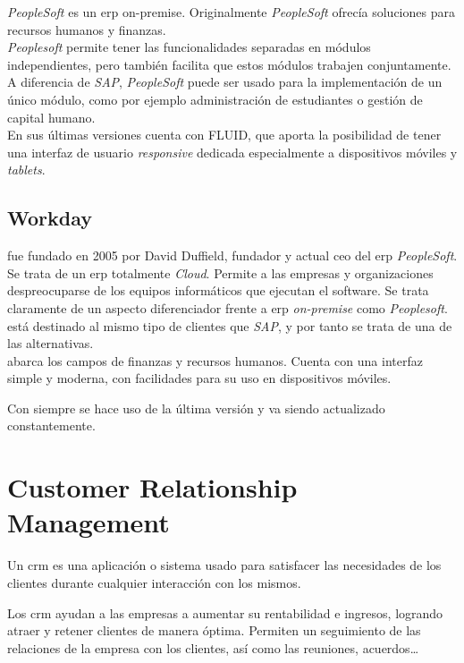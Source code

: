 \textit{PeopleSoft} es un \acrshort{erp} \gls{on-premise}.
Originalmente \textit{PeopleSoft} ofrecía soluciones para recursos humanos y finanzas.\\

\textit{Peoplesoft} permite tener las funcionalidades separadas en módulos independientes, pero también facilita que estos módulos trabajen conjuntamente.
A diferencia de \textit{SAP}, \textit{PeopleSoft} puede ser usado para la implementación de un único módulo, como por ejemplo administración de estudiantes o gestión de capital humano.\\

En sus últimas versiones cuenta con FLUID, que aporta la posibilidad de tener una interfaz de usuario \textit{responsive} dedicada especialmente a dispositivos móviles y \textit{tablets}.


\subsection{Workday}
\wday{} fue fundado en 2005 por David Duffield, fundador y actual \acrshort{ceo} del \acrshort{erp} \textit{PeopleSoft}.\\



Se trata de un \acrshort{erp} totalmente \textit{Cloud}. Permite a las empresas y organizaciones despreocuparse de los equipos informáticos que ejecutan el software. Se trata claramente de un aspecto diferenciador frente a \acrshort{erp} \textit{on-premise} como \textit{Peoplesoft}. 
\wday{} está destinado al mismo tipo de clientes que \textit{SAP}, y por tanto se trata de una de las alternativas.\\


\wday{} abarca los campos de finanzas y recursos humanos. Cuenta con una interfaz simple y moderna, con facilidades para su uso en dispositivos móviles.

Con \wday{} siempre se hace uso de la última versión y va siendo actualizado constantemente.


\section{Customer Relationship Management}

Un \acrfull{crm} es una aplicación o sistema usado para satisfacer las necesidades de los clientes durante cualquier interacción con los mismos.

Los \acrshort{crm} ayudan a las empresas a aumentar su rentabilidad e ingresos, logrando atraer y retener clientes de manera óptima. 
Permiten un seguimiento de las relaciones de la empresa con los clientes, así como las reuniones, acuerdos\ldots



